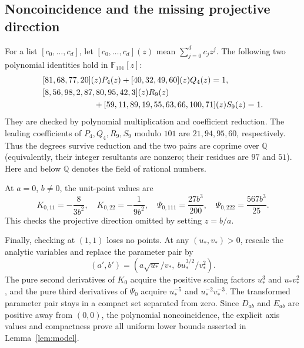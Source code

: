 \documentclass[11pt,a4paper]{article}
\numberwithin{equation}{section}
\theoremstyle{remark}
\newcommand{\Q}{\mathbb Q}
\begin{document}
\subsection{Noncoincidence and the missing projective direction}
For a list $[c_0,\ldots,c_d]$, let $[c_0,\ldots,c_d](z)$ mean
$\sum_{j=0}^d c_jz^j$. The following two polynomial identities hold in
$\mathbb F_{101}[z]$:
\begin{align}
 &[81,68,77,20](z)P_4(z)
       +[40,32,49,60](z)Q_4(z)=1,\label{eq:bezout4}\\
 &[8,56,98,2,87,80,95,42,3](z)R_9(z)\notag\\
 &\hspace{22mm}+[59,11,89,19,55,63,66,100,71](z)S_9(z)=1.
                         \label{eq:bezout9}
\end{align}
They are checked by polynomial multiplication and coefficient reduction.
The leading coefficients of $P_4,Q_4,R_9,S_9$ modulo $101$ are
$21,94,95,60$, respectively. Thus the degrees survive reduction and the
two pairs are coprime over $\Q$ (equivalently, their integer resultants
are nonzero; their residues are $97$ and $51$). Here and below $\Q$
denotes the field of rational numbers.

At $a=0$, $b\ne0$, the unit-point values are
\begin{equation}\label{eq:a-zero}
 K_{0,11}=-\frac8{3b^2},\quad K_{0,22}=-\frac1{9b^2},\quad
 \Psi_{0,111}=\frac{27b^3}{200},\quad
 \Psi_{0,222}=\frac{567b^3}{25}.
\end{equation}
This checks the projective direction omitted by setting $z=b/a$.

Finally, checking at $(1,1)$ loses no points. At any $(u_*,v_*)>0$, rescale
the analytic variables and replace the parameter pair by
\[
 (a',b')=\left(a\sqrt{u_*}/v_*,\ b u_*^{3/2}/v_*^2\right).
\]
The pure second derivatives of $K_0$ acquire the positive scaling factors
$u_*^3$ and $u_*v_*^2$, and the pure third derivatives of $\Psi_0$ acquire
$u_*^{-5}$ and $u_*^{-2}v_*^{-3}$. The transformed parameter pair stays
in a compact set separated from zero. Since $D_{ab}$ and $E_{ab}$ are
positive away from $(0,0)$, the polynomial noncoincidence, the explicit
axis values and compactness prove all uniform lower bounds asserted in
Lemma~\ref{lem:model}.
\end{document}
